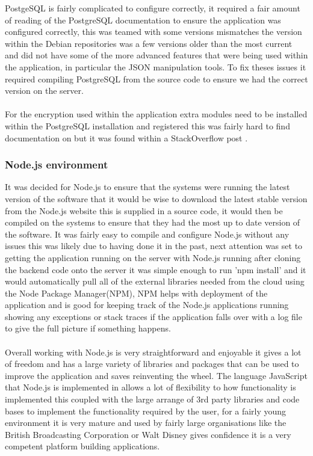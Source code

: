 PostgeSQL is fairly complicated to configure correctly, it required a fair amount of reading of the PostgreSQL documentation \cite{Postgres:APIDocumentation:2015:online} to ensure the application was configured correctly, this was teamed with some versions mismatches the version within the Debian repositories was a few versions older than the most current and did not have some of the more advanced features that were being used within the application, in particular the JSON manipulation tools. To fix theses issues it required compiling PostgreSQL from the source code to ensure we had the correct version on the server.\\
\\
For the encryption used within the application extra modules need to be installed within the PostgreSQL installation and registered this was fairly hard to find documentation on but it was found within a StackOverflow post \cite{se:howtoinstallpgcrypto:2011:online}. 

\subsubsection{Node.js environment}

It was decided for Node.js to ensure that the systems were running the latest version of the software that it would be wise to download the latest stable version from the Node.js website \cite{nodeteam:node:2015:online} this is supplied in a source code, it would then be compiled on the systems to ensure that they had the most up to date version of the software. It was fairly easy to compile and configure Node.js without any issues this was likely due to having done it in the past, next attention was set to getting the application running on the server with Node.js running after cloning the backend code onto the server it was simple enough to run 'npm install' and it would automatically pull all of the external libraries needed from the cloud using the Node Package Manager(NPM), NPM helps with deployment of the application and is good for keeping track of the Node.js applications running showing any exceptions or stack traces if the application falls over with a log file to give the full picture if something happens.\\
\\
Overall working with Node.js is very straightforward and enjoyable it gives a lot of freedom and has a large variety of libraries and packages that can be used to improve the application and saves reinventing the wheel. The language JavaScript that Node.js is implemented in allows a lot of flexibility to how functionality is implemented this coupled with the large arrange of 3rd party libraries and code bases to implement the functionality required by the user, for a fairly young environment it is very mature and used by fairly large organisations like the British Broadcasting Corporation or Walt Disney gives confidence it is a very competent platform building applications.

